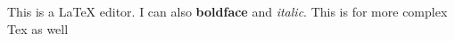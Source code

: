This is a LaTeX editor. I can also \textbf{boldface} and \textit{italic}. This is for more complex Tex as well  